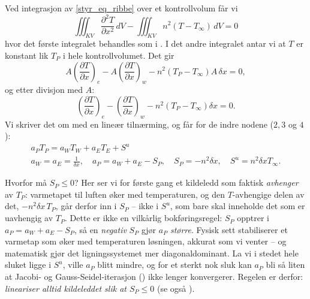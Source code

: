 Ved integrasjon av \eqref{styr_eq_ribbe} over et kontrollvolum får vi 
\[\iiint_{KV} \frac{\partial^2 T}{\partial x^2}\, dV - \iiint_{KV}n^2(T-T_\infty) \, dV=0\]
hvor det første integralet behandles som i . I det andre integralet antar vi at $T$ er konstant lik $T_P$ i hele kontrollvolumet. Det gir
\[A\left(\frac{\partial T}{\partial x}\right)_e -A\left(\frac{\partial T}{\partial x}\right)_w - n^2(T_P-T_\infty)A\,\delta x=0,\]
og etter divisjon med $A$:
\[\left(\frac{\partial T}{\partial x}\right)_e -\left(\frac{\partial T}{\partial x}\right)_w - n^2(T_P-T_\infty)\delta x=0.\]
Vi skriver det om med en lineær tilnærming, og får for de indre nodene ($2,3$ og $4$):
\begin{align*}
a_P T_P = a_W T_W + a_E T_E + S^u\\
a_W = a_E = \frac{1}{\delta x}, \quad a_P = a_W + a_E - S_P, \quad S_P = -n^2 \delta x, \quad S^u = n^2 \delta x T_\infty.
\end{align*}

\begin{rem}{Hvorfor må $S_P\le 0$?}
Her ser vi for første gang et kildeledd som faktisk \emph{avhenger} av $T_P$: varmetapet til luften øker med temperaturen, og den $T$-avhengige delen av det, $-n^2\delta x\,T_P$, går derfor inn i $S_P$ -- ikke i $S^u$, som bare skal inneholde det som er uavhengig av $T_P$. Dette er ikke en vilkårlig bokføringsregel: $S_P$ opptrer i $a_P = a_W+a_E-S_P$, så en \emph{negativ} $S_P$ gjør $a_P$ \emph{større}. Fysisk sett stabiliserer et varmetap som øker med temperaturen løsningen, akkurat som vi venter -- og matematisk gjør det ligningssystemet mer diagonaldominant. La vi i stedet hele sluket ligge i $S^u$, ville $a_P$ blitt mindre, og for et sterkt nok sluk kan $a_P$ bli så liten at Jacobi- og Gauss-Seidel-iterasjon () ikke lenger konvergerer. Regelen er derfor: \emph{lineariser alltid kildeleddet slik at $S_P\le 0$} (se også ).
\end{rem}

